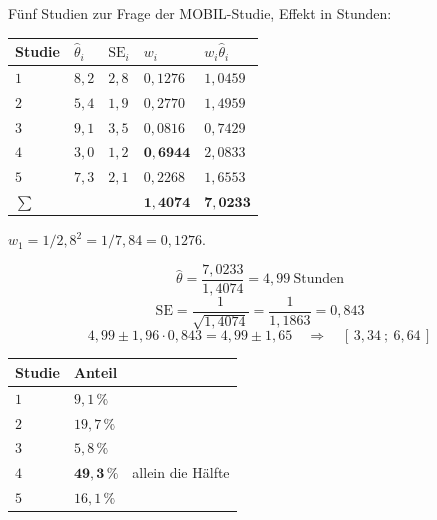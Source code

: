 \begin{merksatz}
Fünf Studien zur Frage der MOBIL-Studie, Effekt in Stunden:

\begin{center}
{\small
\renewcommand{\arraystretch}{1.38}
\begin{tabular}{@{}P{1.4cm}P{1.4cm}P{1.4cm}P{1.6cm}P{1.8cm}@{}}
\toprule
\textbf{Studie} & $\hat\theta_i$ & $\mathrm{SE}_i$ & $w_i$ & $w_i\hat\theta_i$\\
\midrule
$1$ & $8{,}2$ & $2{,}8$ & $0{,}1276$ & $1{,}0459$\\
$2$ & $5{,}4$ & $1{,}9$ & $0{,}2770$ & $1{,}4959$\\
$3$ & $9{,}1$ & $3{,}5$ & $0{,}0816$ & $0{,}7429$\\
$4$ & $3{,}0$ & $1{,}2$ & $\mathbf{0{,}6944}$ & $2{,}0833$\\
$5$ & $7{,}3$ & $2{,}1$ & $0{,}2268$ & $1{,}6553$\\
\midrule
$\sum$ & & & $\mathbf{1{,}4074}$ & $\mathbf{7{,}0233}$\\
\bottomrule
\end{tabular}}
\end{center}

 $w_1 = 1/2{,}8^2 = 1/7{,}84 = 0{,}1276$.

\[ \hat\theta = \frac{7{,}0233}{1{,}4074} = 4{,}99 \ \text{Stunden} \]
\[ \mathrm{SE} = \frac{1}{\sqrt{1{,}4074}} = \frac{1}{1{,}1863} = 0{,}843 \]
\[ 4{,}99 \pm 1{,}96 \cdot 0{,}843 = 4{,}99 \pm 1{,}65 \quad\Longrightarrow\quad [\,3{,}34\ ;\ 6{,}64\,] \]

\begin{center}
\renewcommand{\arraystretch}{1.42}
\begin{tabular}{@{}P{1.6cm}P{2.2cm}P{2.6cm}@{}}
\toprule
\textbf{Studie} & \textbf{Anteil} & \\
\midrule
$1$ & $9{,}1\,\%$ & \\
$2$ & $19{,}7\,\%$ & \\
$3$ & $5{,}8\,\%$ & \\
$4$ & \textcolor{akzent}{$\mathbf{49{,}3\,\%}$} & \textcolor{akzent}{allein die Hälfte}\\
$5$ & $16{,}1\,\%$ & \\
\bottomrule
\end{tabular}
\end{center}

\begin{center}
\begin{minipage}{0.88\textwidth}
\end{minipage}
\end{center}
\end{merksatz}


